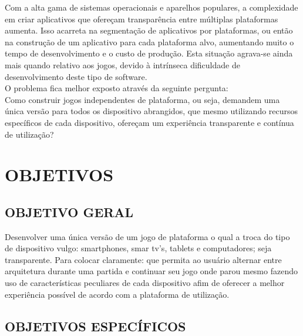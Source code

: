\documentclass{article}
\begin{document}
Com a alta gama de sistemas operacionais e aparelhos populares, a complexidade em criar aplicativos que ofereçam transparência entre múltiplas plataformas aumenta. Isso acarreta na segmentação de aplicativos por plataformas, ou então na construção de um aplicativo para cada plataforma alvo, aumentando muito o tempo de desenvolvimento e o custo de produção. Esta situação agrava-se ainda mais quando relativo aos jogos, devido à intrínseca dificuldade de desenvolvimento deste tipo de software. 
\\
O problema fica melhor exposto através da seguinte pergunta: 
\\
	Como construir jogos independentes de plataforma, ou seja, demandem uma única versão para todos os dispositivo abrangidos, que mesmo utilizando recursos específicos de cada dispositivo, ofereçam um experiência transparente e contínua de utilização?
\section{OBJETIVOS}
\subsection{OBJETIVO GERAL} 

Desenvolver uma única versão de um jogo de plataforma o qual a troca do tipo de dispositivo vulgo: smartphones, smar tv's, tablets e computadores; seja transparente. Para colocar claramente: que  permita ao usuário alternar entre arquitetura durante uma partida e continuar seu jogo onde parou mesmo fazendo uso de características peculiares de cada dispositivo afim de oferecer a melhor experiência possível de acordo com a plataforma de utilização. 

\subsection{OBJETIVOS ESPECÍFICOS} 
\end{document}
